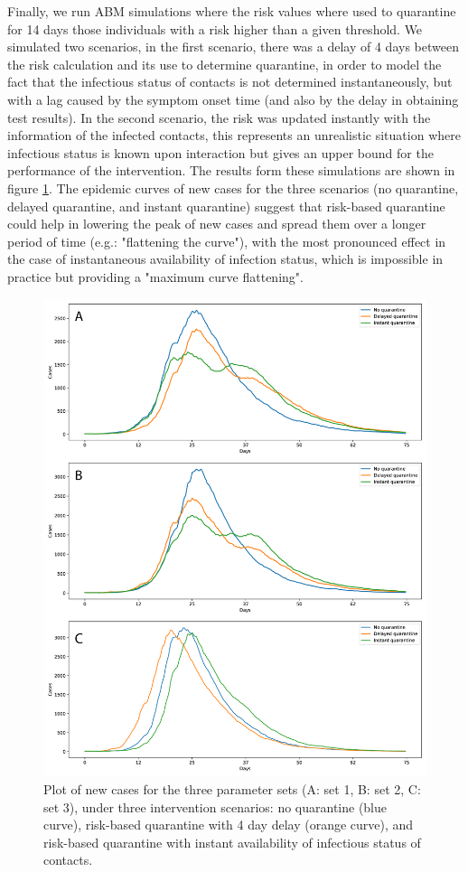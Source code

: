 \documentclass{article}
\begin{document}
Finally, we run ABM simulations where the risk values where used to quarantine for 14 days those individuals with a risk higher than a given threshold. We simulated two scenarios, in the first scenario, there was a delay of 4 days between the risk calculation and its use to determine quarantine, in order to model the fact that the infectious status of contacts is not determined instantaneously, but with a lag caused by the symptom onset time (and also by the delay in obtaining test results). In the second scenario, the risk was updated instantly with the information of the infected contacts, this represents an unrealistic situation where infectious status is known upon interaction but gives an upper bound for the performance of the intervention. The results form these simulations are shown in figure \ref{fig:fig5}. The epidemic curves of new cases for the three scenarios (no quarantine, delayed quarantine, and instant quarantine) suggest that risk-based quarantine could help in lowering the peak of new cases and spread them over a longer period of time (e.g.: "flattening the curve"), with the most pronounced effect in the case of instantaneous availability of infection status, which is impossible in practice but providing a "maximum curve flattening".

\begin{figure} %
  \centering
  \includegraphics[scale=0.4]{Figure-5.png}
  \caption{Plot of new cases for the three parameter sets (A: set 1, B: set 2, C: set 3), under three intervention scenarios: no quarantine (blue curve), risk-based quarantine with 4 day delay (orange curve), and risk-based quarantine with instant availability of infectious status of contacts.}
  \label{fig:fig5}
\end{figure}
\end{document}
